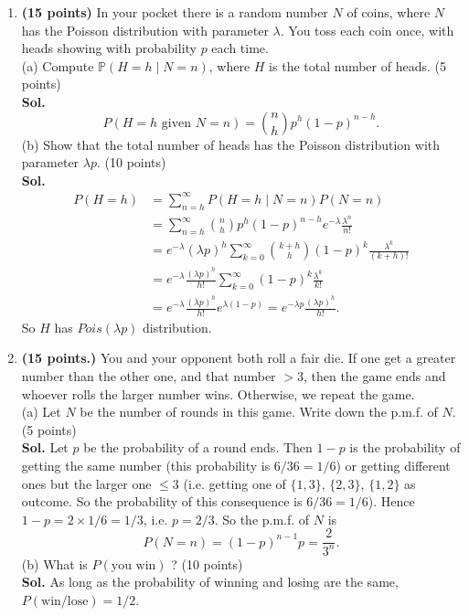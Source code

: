 \documentclass[12pt]{article}
\begin{document}
\begin{enumerate}
    \item \textbf{(15 points)} In your pocket there is a random number $N$ of coins, where $N$ has the Poisson distribution with parameter $\lambda$. You toss each coin once, with heads showing with probability $p$ each time.\\
    (a) Compute $\mathbb{P}(H=h\mid N=n)$, where $H$ is the total number of heads. (5 points) \\
    \textbf{Sol.}
    \begin{equation*}
    P(H=h \text{ given } N=n)=\binom{n}{h}p^h(1-p)^{n-h}.
    \end{equation*}
    (b) Show that the total number of heads has the Poisson distribution with parameter $\lambda p$. (10 points) \\
    \textbf{Sol.}
    \begin{equation*}
    \begin{aligned}
    P(H=h)&=\sum_{n=h}^\infty P(H=h\mid N=n)P(N=n) \\&
    =\sum_{n=h}^\infty 
    \binom{n}{h}p^h(1-p)^{n-h}e^{-\lambda}\frac{\lambda^n}{n!} \\&
    =e^{-\lambda}(\lambda p)^h\sum_{k=0}^\infty\binom{k+h}{h}(1-p)^{k}\frac{\lambda^k}{(k+h)!} \\&
    =e^{-\lambda}\frac{(\lambda p)^h}{h!}\sum_{k=0}^\infty(1-p)^{k}\frac{\lambda^k}{k!} \\&
    =e^{-\lambda}\frac{(\lambda p)^h}{h!}e^{\lambda(1-p)}=e^{-\lambda p}\frac{(\lambda p)^h}{h!}.
    \end{aligned}
    \end{equation*}
    So $H$ has $Pois(\lambda p)$ distribution.
    \item \textbf{(15 points.)} You and your opponent both roll a fair die. If one get a greater number than the other one, and that number $>3$, then the game ends and whoever rolls the larger number wins. Otherwise, we repeat the game.\\
    (a) Let $N$ be the number of rounds in this game. Write down the p.m.f. of $N$. (5 points) \\
    \textbf{Sol.} Let $p$ be the probability of a round ends. Then $1-p$ is the probability of getting the same number (this probability is $6/36=1/6$) or getting different ones but the larger one $\leq 3$ (i.e. getting one of $\{1,3\},\,\{2,3\},\,\{1,2\}$ as outcome. So the probability of this consequence is $6/36=1/6$). Hence $1-p=2\times 1/6=1/3$, i.e. $p=2/3$. So the p.m.f. of $N$ is
    \begin{equation*}
    P(N=n)=(1-p)^{n-1}p=\frac{2}{3^n}.
    \end{equation*}
    (b) What is $P(\text{you win})$ ? (10 points)\\
    \textbf{Sol.} As long as the probability of winning and losing are the same, $P(\text{win/lose})=1/2$.


\end{enumerate}
\end{document}
